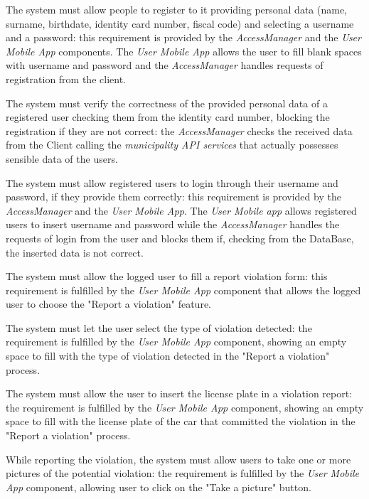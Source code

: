 \documentclass[a4paper]{report}
\begin{document}
\begin{enumerate}[start=1,label={[R\arabic*]}]
\item \label{[R1]} The system must allow people to register to it providing personal data (name, surname, birthdate, identity card number, fiscal code) and selecting a username and a password: this requirement is provided by the \textit{AccessManager} and the \textit{User Mobile App} components. The \textit{User Mobile App} allows the user to fill blank spaces with username and password and the \textit{AccessManager} handles requests of registration from the client.
\item \label{[R2]} The system must verify the correctness of the provided personal data of a registered user checking them from the identity card number, blocking the registration if they are not correct: the \textit{AccessManager} checks the received data from the Client calling the \textit{municipality API services} that actually possesses sensible data of the users. 
\item  \label{[R3]}The system must allow registered users to login through their username and password, if they provide them correctly: this requirement is provided by the \textit{AccessManager} and the \textit{User Mobile App}. The \textit{User Mobile app} allows registered users to insert username and password while the \textit{AccessManager} handles the requests of login from the user and blocks them  if, checking from the DataBase, the inserted data is not correct. 
\item \label{[R4]} The system must allow the logged user to fill a report violation form: this requirement is fulfilled by the \textit{User Mobile App} component that allows the logged user to choose the "Report a violation" feature.
\item  \label{[R5]}The system must let the user select the type of violation detected: the requirement is fulfilled by the \textit{User Mobile App} component, showing an empty space to fill with the type of violation detected in the "Report a violation" process.
\item  \label{[R6]} The system must allow the user to insert the license plate in a violation report:  the requirement is fulfilled by the \textit{User Mobile App} component, showing an empty space to fill with the license plate of the car that committed the violation in the "Report a violation" process.
\item  \label{[R7]}While reporting the violation, the system must allow users to take one or more pictures of the potential violation: the requirement is fulfilled by the \textit{User Mobile App} component, allowing user to click on the "Take a picture" button.

\end{enumerate}
\end{document}

